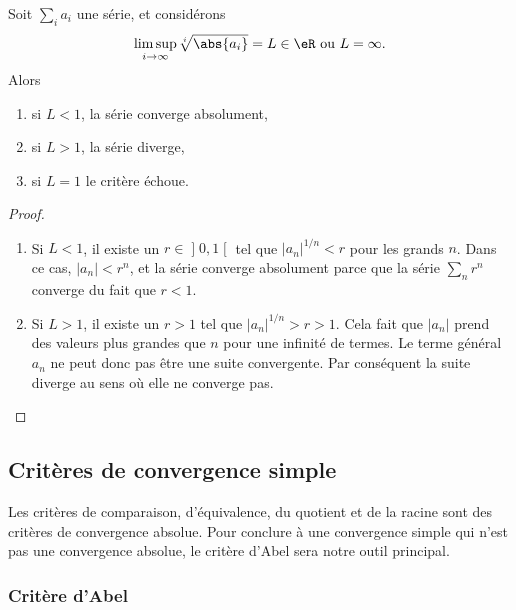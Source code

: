 \begin{proposition}
    Soit $\sum_i a_i$ une série, et considérons
    \begin{equation*}
      \limsup_{i \rightarrow \infty} \sqrt[i]{\abs{a_i}} = L \in \eR
      \text{ ou $L =
        \infty$.}
    \end{equation*}
    Alors
    \begin{enumerate}
    \item si $L < 1$, la série converge absolument,
    \item si $L> 1$, la série diverge,
    \item si $L = 1$ le critère échoue.
    \end{enumerate}
\end{proposition}

\begin{proof}
    \begin{enumerate}
        \item
            Si $L<1$, il existe un $r\in \mathopen] 0 , 1 \mathclose[$ tel que $| a_n |^{1/n}<r$ pour les grands $n$. Dans ce cas, $| a_n |<r^{n}$, et la série converge absolument parce que la série $\sum_nr^n$ converge du fait que $r<1$.
        \item
            Si $L>1$, il existe un $r>1$ tel que $| a_n |^{1/n}>r>1$. Cela fait que $| a_n |$ prend des valeurs plus grandes que $n$ pour une infinité de termes. Le terme général $a_n$ ne peut donc pas être une suite convergente. Par conséquent la suite diverge au sens où elle ne converge pas.

    \end{enumerate}
\end{proof}

\subsection{Critères de convergence simple}

Les critères de comparaison, d'équivalence, du quotient et de la racine sont des critères de convergence absolue. Pour conclure à une convergence simple qui n'est pas une convergence absolue, le critère d'Abel sera notre outil principal.  

\subsubsection{Critère d'Abel}

